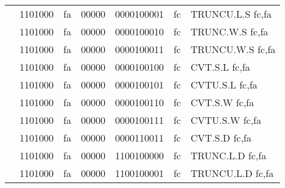 \begin{table}[p]
\begin{small}
\begin{center}
\begin{tabular}{rcccccccccl}
&
\multicolumn{2}{|c|}{1101000} &
\multicolumn{1}{c|}{fa} &
\multicolumn{1}{c|}{00000} &
\multicolumn{4}{c|}{0000100001} &
\multicolumn{1}{c|}{fc} & TRUNCU.L.S fc,fa \\
\cline{2-10}
  

&
\multicolumn{2}{|c|}{1101000} &
\multicolumn{1}{c|}{fa} &
\multicolumn{1}{c|}{00000} &
\multicolumn{4}{c|}{0000100010} &
\multicolumn{1}{c|}{fc} & TRUNC.W.S fc,fa \\
\cline{2-10}
  

&
\multicolumn{2}{|c|}{1101000} &
\multicolumn{1}{c|}{fa} &
\multicolumn{1}{c|}{00000} &
\multicolumn{4}{c|}{0000100011} &
\multicolumn{1}{c|}{fc} & TRUNCU.W.S fc,fa \\
\cline{2-10}
  

&
\multicolumn{2}{|c|}{1101000} &
\multicolumn{1}{c|}{fa} &
\multicolumn{1}{c|}{00000} &
\multicolumn{4}{c|}{0000100100} &
\multicolumn{1}{c|}{fc} & CVT.S.L fc,fa \\
\cline{2-10}
  

&
\multicolumn{2}{|c|}{1101000} &
\multicolumn{1}{c|}{fa} &
\multicolumn{1}{c|}{00000} &
\multicolumn{4}{c|}{0000100101} &
\multicolumn{1}{c|}{fc} & CVTU.S.L fc,fa \\
\cline{2-10}
  

&
\multicolumn{2}{|c|}{1101000} &
\multicolumn{1}{c|}{fa} &
\multicolumn{1}{c|}{00000} &
\multicolumn{4}{c|}{0000100110} &
\multicolumn{1}{c|}{fc} & CVT.S.W fc,fa \\
\cline{2-10}
  

&
\multicolumn{2}{|c|}{1101000} &
\multicolumn{1}{c|}{fa} &
\multicolumn{1}{c|}{00000} &
\multicolumn{4}{c|}{0000100111} &
\multicolumn{1}{c|}{fc} & CVTU.S.W fc,fa \\
\cline{2-10}
  

&
\multicolumn{2}{|c|}{1101000} &
\multicolumn{1}{c|}{fa} &
\multicolumn{1}{c|}{00000} &
\multicolumn{4}{c|}{0000110011} &
\multicolumn{1}{c|}{fc} & CVT.S.D fc,fa \\
\cline{2-10}
  

&
\multicolumn{2}{|c|}{1101000} &
\multicolumn{1}{c|}{fa} &
\multicolumn{1}{c|}{00000} &
\multicolumn{4}{c|}{1100100000} &
\multicolumn{1}{c|}{fc} & TRUNC.L.D fc,fa \\
\cline{2-10}
  

&
\multicolumn{2}{|c|}{1101000} &
\multicolumn{1}{c|}{fa} &
\multicolumn{1}{c|}{00000} &
\multicolumn{4}{c|}{1100100001} &
\multicolumn{1}{c|}{fc} & TRUNCU.L.D fc,fa \\
\cline{2-10}
  


\end{tabular}
\end{center}
\end{small}
\end{table}
